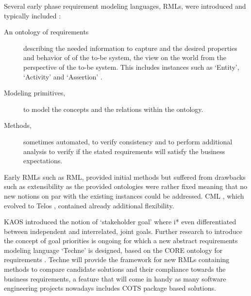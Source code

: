 Several early phase requirement modeling languages, RMLs, were introduced and typically included : 
\begin{description}
	\item[An ontology of requirements] describing the needed information to capture and the desired properties and behavior of of the to-be system, the view on the world from the perspective of the to-be system. This includes instances such as `Entity', `Activity' and `Assertion' .
	\item[Modeling primitives,] to model the concepts and the relations within the ontology.
	\item[Methods,] sometimes automated, to verify consistency and to perform additional analysis to verify if the stated requirements will satisfy the business expectations.
\end{description}

\noindent
{}


Early RMLs such as RML, provided initial methods but suffered from drawbacks such as extensibility as the provided ontologies were rather fixed meaning that no new notions on par with the existing instances could be addressed. CML  , which evolved to Telos , contained already additional flexibility. 

KAOS  introduced the notion of `stakeholder goal' where i*  even differentiated between independent and interrelated, joint goals.
Further research to introduce the concept of goal priorities is ongoing for which a new abstract requirements modeling language `Techne'  is designed, based on the CORE ontology for requirements . Techne will provide the framework for new RMLs containing methods to compare candidate solutions and their compliance towards the business requirements, a feature that will come in handy as many software engineering projects nowadays includes COTS package based solutions.

